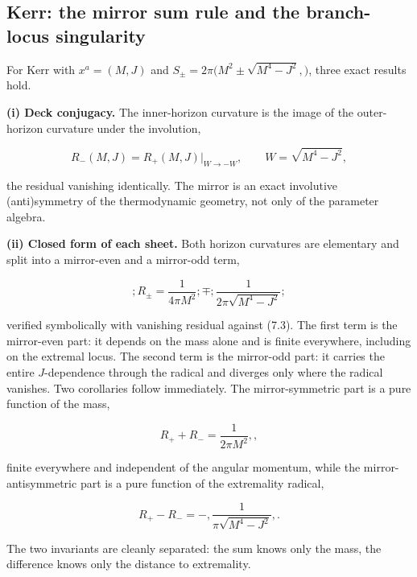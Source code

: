 \documentclass[11pt]{article}
\begin{document}
\subsection{Kerr: the mirror sum rule and the branch-locus singularity}

For Kerr with $x^a = (M,J)$ and $S_\pm = 2\pi\big(M^2 \pm \sqrt{M^4 - J^2},\big)$, three exact results hold.

\textbf{(i) Deck conjugacy.} The inner-horizon curvature is the image of the outer-horizon curvature under the involution,

\begin{equation*}
R_-(M,J) = R_+(M,J)\big|_{W \to -W}, \qquad W = \sqrt{M^4 - J^2},
\tag{7.3}
\end{equation*}

the residual vanishing identically. The mirror is an exact involutive (anti)symmetry of the thermodynamic geometry, not only of the parameter algebra.

\textbf{(ii) Closed form of each sheet.} Both horizon curvatures are elementary and split into a mirror-even and a mirror-odd term,

\begin{equation*}
\boxed{;R_\pm = \frac{1}{4\pi M^2} ;\mp; \frac{1}{2\pi\sqrt{M^4 - J^2}};}
\tag{7.4}
\end{equation*}

verified symbolically with vanishing residual against (7.3). The first term is the mirror-even part: it depends on the mass alone and is finite everywhere, including on the extremal locus. The second term is the mirror-odd part: it carries the entire $J$-dependence through the radical and diverges only where the radical vanishes. Two corollaries follow immediately. The mirror-symmetric part is a pure function of the mass,

\begin{equation*}
R_+ + R_- = \frac{1}{2\pi M^2}, ,
\tag{7.5}
\end{equation*}

finite everywhere and independent of the angular momentum, while the mirror-antisymmetric part is a pure function of the extremality radical,

\begin{equation*}
R_+ - R_- = -,\frac{1}{\pi\sqrt{M^4 - J^2}}, .
\tag{7.6}
\end{equation*}

The two invariants are cleanly separated: the sum knows only the mass, the difference knows only the distance to extremality.
\end{document}
